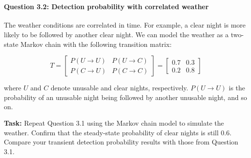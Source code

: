 \documentclass[11pt]{article}
\begin{document}
    \begin{center}
    \end{center}
    { \hspace*{\fill} \\}
    
    \paragraph{Question 3.2: Detection probability with correlated
weather}\label{question-3.2-detection-probability-with-correlated-weather}

The weather conditions are correlated in time. For example, a clear
night is more likely to be followed by another clear night. We can model
the weather as a two-state Markov chain with the following transition
matrix:

\[
T = 
\begin{bmatrix}
P(U \to U) & P(U \to C) \\
P(C \to U) & P(C \to C)
\end{bmatrix}
= \begin{bmatrix}
0.7 & 0.3 \\
0.2 & 0.8
\end{bmatrix}
\]

where \(U\) and \(C\) denote unusable and clear nights, respectively.
\(P(U \to U)\) is the probability of an unusable night being followed by
another unusable night, and so on.

\textbf{Task:} Repeat Question 3.1 using the Markov chain model to
simulate the weather. Confirm that the steady-state probability of clear
nights is still 0.6. Compare your transient detection probability
results with those from Question 3.1.
\end{document}
